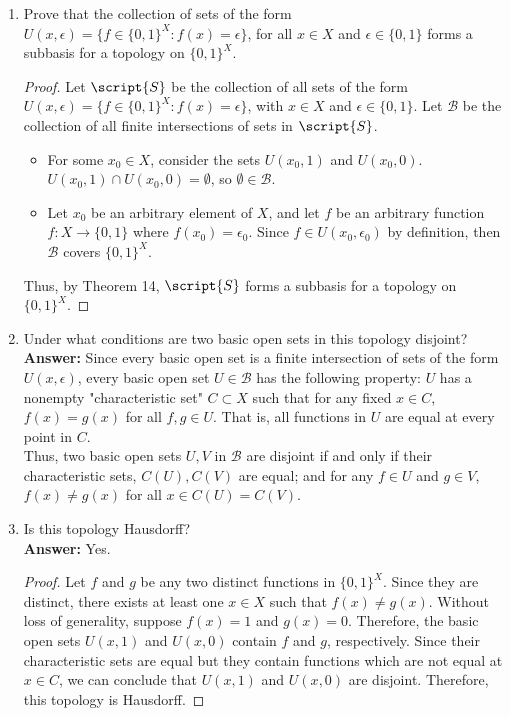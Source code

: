 \documentclass[letterpaper]{article}
\newcommand{\B}{\mathcal{B}}
\begin{document}
\begin{enumerate}
	\begin{enumerate}
	\item Prove that the collection of sets of the form $U(x, \epsilon) = \{ f \in \{0,1\}^X : f(x) = \epsilon\}$, for all $x \in X$ and $\epsilon \in \{0,1\}$ forms a subbasis for a topology on $\{0,1\}^X$. 
	\begin{proof} Let $\script{S}$ be the collection of all sets of the form $U(x, \epsilon) = \{ f \in \{0,1\}^X : f(x) = \epsilon\}$, with $x \in X$ and $\epsilon \in \{0,1\}$. Let $\B$ be the collection of all finite intersections of sets in $\script{S}$. 
		\begin{itemize}
		\item For some $x_0\in X$, consider the sets $U(x_0, 1)$ and $U(x_0, 0)$. $U(x_0, 1)\cap U(x_0, 0)=\emptyset$, so $\emptyset\in\B$. 
		\item Let $x_0$ be an arbitrary element of $X$, and let $f$ be an arbitrary function $f:X\to\{0,1\}$ where $f(x_0)=\epsilon_0$. Since $f\in U(x_0,\epsilon_0)$ by definition, then $\B$ covers $\{0,1\}^X$. 
		\end{itemize}
	
	Thus, by Theorem 14, $\script{S}$ forms a subbasis for a topology on $\{0,1\}^X$. 
	\end{proof}
	\item Under what conditions are two basic open sets in this topology disjoint? \\
	\textbf{Answer: }Since every basic open set is a finite intersection of sets of the form $U(x,\epsilon)$, every basic open set $U\in\B$ has the following property: $U$ has a nonempty "characteristic set" $C\subset X$ such that for any fixed $x\in C$, $f(x)=g(x)$ for all $f,g\in U$. That is, all functions in $U$ are equal at every point in $C$.\\
	Thus, two basic open sets $U,V$ in $\B$ are disjoint if and only if their characteristic sets, $C(U), C(V)$ are equal; and for any $f\in U$ and $g\in V$, $f(x) \neq g(x)$ for all $x\in C(U)=C(V)$.
	
	\item Is this topology Hausdorff?\\
	\textbf{Answer: }Yes.
	\begin{proof}
	Let $f$ and $g$ be any two distinct functions in $\{0,1\}^X$. Since they are distinct, there exists at least one $x \in X$ such that $f(x)\neq g(x)$. Without loss of generality, suppose $f(x)=1$ and $g(x)=0$. Therefore, the basic open sets $U(x,1)$ and $U(x,0)$ contain $f$ and $g$, respectively. Since their characteristic sets are equal but they contain functions which are not equal at $x\in C$, we can conclude that $U(x,1)$ and $U(x,0)$ are disjoint. Therefore, this topology is Hausdorff. 
	\end{proof}	 
	\end{enumerate}		


\end{enumerate}
\end{document}
